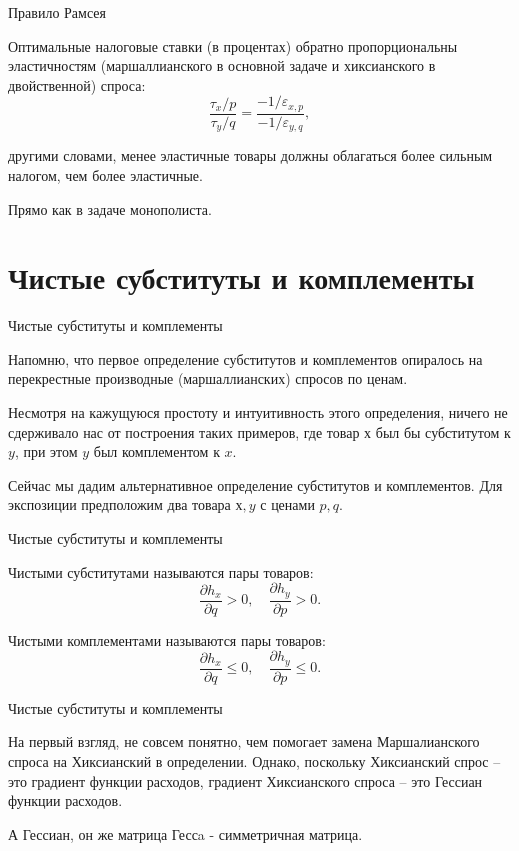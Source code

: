 \documentclass{beamer}
\begin{document}
\begin{frame}{Правило Рамсея}

\begin{lemma}
Оптимальные налоговые ставки (в процентах) обратно пропорциональны эластичностям (маршаллианского в основной задаче и хиксианского в двойственной) спроса:
$$ \frac{\tau_x/p}{\tau_y/q} = \frac{-1/\varepsilon_{x,p}}{-1/\varepsilon_{y,q}},$$
\end{lemma}
другими словами, менее эластичные товары должны облагаться более сильным налогом, чем более эластичные.

Прямо как в задаче монополиста.

\end{frame}

\section{Чистые субституты и комплементы}

\begin{frame}{Чистые субституты и комплементы}

Напомню, что первое определение субститутов и комплементов опиралось на перекрестные производные (маршаллианских) спросов по ценам. 

Несмотря на кажущуюся простоту и интуитивность этого определения, ничего не сдерживало нас от построения таких примеров, где товар $х$ был бы субститутом к $y$, при этом $y$ был комплементом к $x$.

Сейчас мы дадим альтернативное определение субститутов и комплементов. Для экспозиции предположим два товара $х,y$ с ценами $p,q$.
\end{frame}

\begin{frame}{Чистые субституты и комплементы}

\begin{definition}
\alert{Чистыми субститутами} называются пары товаров:
$$
\frac{\partial h_x}{\partial q} > 0, \quad \frac{\partial h_y}{\partial p} > 0.
$$

\alert{Чистыми комплементами} называются пары товаров: 
$$
\frac{\partial h_x}{\partial q} \leqslant 0, \quad \frac{\partial h_y}{\partial p} \leqslant 0.
$$
\end{definition}

\end{frame}

\begin{frame}{Чистые субституты и комплементы}

На первый взгляд, не совсем понятно, чем помогает замена Маршалианского спроса на Хиксианский в определении. Однако, поскольку Хиксианский спрос – это градиент функции расходов, градиент Хиксианского спроса – это Гессиан функции расходов. 

А Гессиан, он же матрица Гессa - симметричная матрица.

\end{frame}
\end{document}
